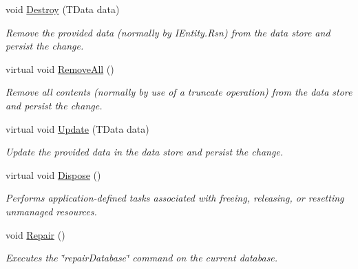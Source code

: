 \begin{DoxyCompactItemize}
void \hyperlink{classCqrs_1_1Mongo_1_1DataStores_1_1MongoDataStore_af97319aef1f0484666d9ea12578b8df9_af97319aef1f0484666d9ea12578b8df9}{Destroy} (T\+Data data)
\begin{DoxyCompactList}\small\item\em Remove the provided {\itshape data}  (normally by I\+Entity.\+Rsn) from the data store and persist the change. \end{DoxyCompactList}\item 
virtual void \hyperlink{classCqrs_1_1Mongo_1_1DataStores_1_1MongoDataStore_a878966ea796321cae54c3c619e3178d5_a878966ea796321cae54c3c619e3178d5}{Remove\+All} ()
\begin{DoxyCompactList}\small\item\em Remove all contents (normally by use of a truncate operation) from the data store and persist the change. \end{DoxyCompactList}\item 
virtual void \hyperlink{classCqrs_1_1Mongo_1_1DataStores_1_1MongoDataStore_a03aac0495445d34f124db893cd09cbd8_a03aac0495445d34f124db893cd09cbd8}{Update} (T\+Data data)
\begin{DoxyCompactList}\small\item\em Update the provided {\itshape data}  in the data store and persist the change. \end{DoxyCompactList}\item 
virtual void \hyperlink{classCqrs_1_1Mongo_1_1DataStores_1_1MongoDataStore_a4af729196a5fa4962961c9ce38b74891_a4af729196a5fa4962961c9ce38b74891}{Dispose} ()
\begin{DoxyCompactList}\small\item\em Performs application-\/defined tasks associated with freeing, releasing, or resetting unmanaged resources. \end{DoxyCompactList}\item 
void \hyperlink{classCqrs_1_1Mongo_1_1DataStores_1_1MongoDataStore_a1c26771b4a655e138b55b8082795a52f_a1c26771b4a655e138b55b8082795a52f}{Repair} ()
\begin{DoxyCompactList}\small\item\em Executes the \char`\"{}repair\+Database\char`\"{} command on the current database. \end{DoxyCompactList}\end{DoxyCompactItemize}
